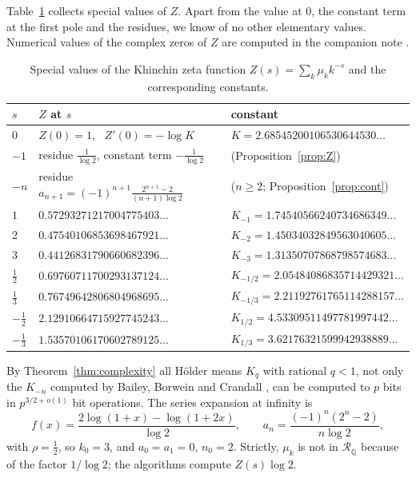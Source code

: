 \documentclass[11pt,reqno]{amsart}
\theoremstyle{definition}
\theoremstyle{remark}
\newcommand{\Qbar}{\overline{\mathbb{Q}}}
\newcommand{\RegQ}{\mathcal{R}_{\Qbar}}
\begin{document}
Table~\ref{tab:Zvalues} collects special values of $Z$.
Apart from the value at $0$, the constant term at the first pole
and the residues, we know of no other elementary values.
Numerical values of the complex zeros of $Z$
are computed in the companion note \cite{Joh26}.

\begin{table}[t]
\centering\small
\caption{Special values of the Khinchin zeta function $Z(s) = \sum_k\mu_kk^{-s}$ and the corresponding constants.}
\label{tab:Zvalues}
\begin{tabular}{@{}lll@{}}
\toprule
$s$ & $Z$ at $s$ & constant \\
\midrule
$0$ & $Z(0) = 1$, \ $Z'(0) = -\log K$ & $K = 2.68545200106530644530\ldots$ \\
$-1$ & residue $\frac1{\log2}$, constant term $-\frac1{\log2}$ & (Proposition~\ref{prop:Z}) \\
$-n$ & residue $a_{n+1} = (-1)^{n+1}\frac{2^{n+1}-2}{(n+1)\log2}$ & ($n \ge 2$; Proposition~\ref{prop:cont}) \\
$1$ & $0.57293271217004775403\ldots$ & $K_{-1} = 1.74540566240734686349\ldots$ \\
$2$ & $0.47540106853698467921\ldots$ & $K_{-2} = 1.45034032849563040605\ldots$ \\
$3$ & $0.44126831790660682396\ldots$ & $K_{-3} = 1.31350707868798574683\ldots$ \\
$\frac12$ & $0.69760711700293137124\ldots$ & $K_{-1/2} = 2.05484086835714429321\ldots$ \\
$\frac13$ & $0.76749642806804968695\ldots$ & $K_{-1/3} = 2.21192761765114288157\ldots$ \\
$-\frac12$ & $2.12910664715927745243\ldots$ & $K_{1/2} = 4.53309511497781997442\ldots$ \\
$-\frac13$ & $1.53570106170602789125\ldots$ & $K_{1/3} = 3.62176321599942938889\ldots$ \\
\bottomrule
\end{tabular}
\end{table}

By Theorem~\ref{thm:complexity} all H\"older means
$K_q$ with rational $q < 1$, not only the $K_{-n}$ computed by Bailey, Borwein and Crandall \cite{BBC97}, can be
computed to $p$ bits in $p^{3/2+o(1)}$ bit operations.
The series expansion at infinity is
\[
  f(x) = \frac{2\log(1+x) - \log(1+2x)}{\log 2}, \qquad a_n = \frac{(-1)^n(2^n - 2)}{n\log 2},
\]
with $\rho = \frac12$, so $k_0 = 3$, and $a_0 = a_1 = 0$, $n_0 = 2$. Strictly, $\mu_k$ is not in $\RegQ$ because of
the factor $1/\log 2$; the algorithms compute $Z(s)\log 2$.
\end{document}
